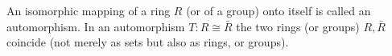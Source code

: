An isomorphic mapping of a ring $R$ (or of a group) onto itself is called an automorphism. In an automorphism $T: R \cong \bar{R}$ the two rings (or groups) $R, \bar{R}$ coincide (not merely as sets but also as rings, or groups).
